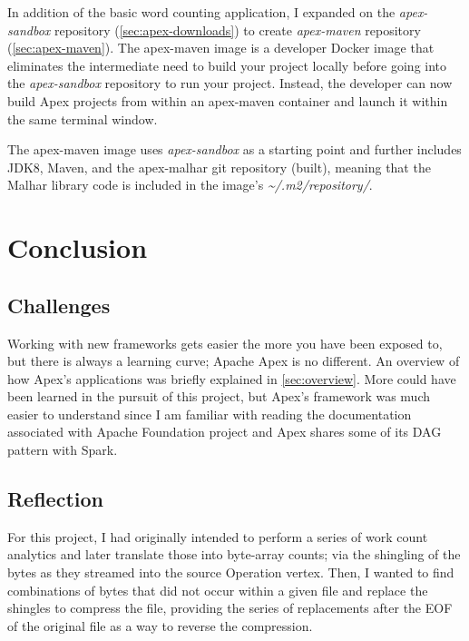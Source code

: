 \documentclass[final]{IEEEtran}
\begin{document}
In addition of the basic word counting application, I expanded on the \textit{apex-sandbox} repository (\ref{sec:apex-downloads}) to create \textit{apex-maven} repository (\ref{sec:apex-maven}). The apex-maven image is a developer Docker image that eliminates the intermediate need to build your project locally before going into the \textit{apex-sandbox} repository to run your project. Instead, the developer can now build Apex projects from within an apex-maven container and launch it within the same terminal window.

The apex-maven image uses \textit{apex-sandbox} as a starting point and further includes JDK8, Maven, and the apex-malhar git repository (built), meaning that the Malhar library code is included in the image's \textsl{\textasciitilde/.m2/repository/}.

\section{Conclusion}
\subsection{Challenges}
Working with new frameworks gets easier the more you have been exposed to, but there is always a learning curve; Apache Apex is no different. An overview of how Apex's applications was briefly explained in \ref{sec:overview}. More could have been learned in the pursuit of this project, but Apex's framework was much easier to understand since I am familiar with reading the documentation associated with Apache Foundation project and Apex shares some of its DAG pattern with Spark.

\subsection{Reflection}
For this project, I had originally intended to perform a series of work count analytics and later translate those into byte-array counts; via the shingling of the bytes as they streamed into the source Operation vertex. Then, I wanted to find combinations of bytes that did not occur within a given file and replace the shingles to compress the file, providing the series of replacements after the EOF of the original file as a way to reverse the compression.
\end{document}
